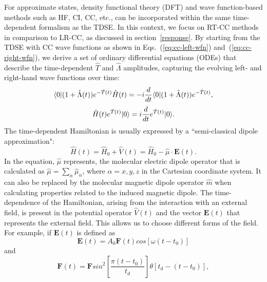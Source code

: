For approximate states, density functional theory (DFT) and wave function-based methods such as HF,\cite{Beck2000, Li2005, Kvaal2011} CI,\cite{Klamroth2003, Krause2005, Krause2007} CC,\cite{Kvaal2012, Nascimento2016, Nascimento2017, Pedersen2019, Kristiansen2020, Ofstad2023, Hauge2023, Park2019, Park2021} etc., can be incorporated within the same time-dependent formalism as the TDSE. In this context, we focus on RT-CC methods in comparison to LR-CC, as discussed in section~\ref{response}. By starting from the TDSE with CC wave functions as shown in Eqs.~(\ref{eq:cc-left-wfn}) and~(\ref{eq:cc-right-wfn}), we derive a set of ordinary differential equations (ODEs) that describe the time-dependent $\hat{T}$ and $\hat{\Lambda}$ amplitudes, capturing the evolving left- and right-hand wave functions over time:
\begin{equation}
\langle0 |(1 + \hat{\Lambda}(t))e^{-\hat{T}(t)}\hat{H}(t) = -i\frac{d}{dt}\langle0 |(1 + \hat{\Lambda}(t))e^{-\hat{T}(t)},
\label{eq:rt-left-wfn}
\end{equation}
\begin{equation}
\hat{H}(t)e^{\hat{T}(t)}| 0 \rangle=i\frac{d}{dt}e^{\hat{T}(t)}| 0 \rangle.
\label{eq:rt-right-wfn}
\end{equation}
The time-dependent Hamiltonian is usually expressed by a ``semi-classical dipole approximation":
\begin{equation}
\hat{H}(t) = \hat{H}_{0} + \hat{V}(t) = \hat{H}_{0} - \hat{\mu} \cdot \textbf{E}(t).
\end{equation}
In the equation, $\hat{\mu}$ represents, the molecular electric dipole operator that is calculated as $\hat{\mu}=\sum_{\alpha}\hat{\mu}_{\alpha}$, where $\alpha=x, y, z$ in the Cartesian coordinate system. It can also be replaced by the molecular magnetic dipole operator $\hat{m}$ when calculating properties related to the induced magnetic dipole. The time-dependence of the Hamiltonian, arising from the interaction with an external field, is present in the potential operator $\hat{V}(t)$ and the vector $\textbf{E}(t)$ that represents the external field. This allows us to choose different forms of the field. For example, if $\textbf{E}(t)$ is defined as
\begin{equation}
\textbf{E}(t) = A_{0}\textbf{F}(t)cos[\omega(t-t_{0})]
\end{equation}
and
\begin{equation}
\textbf{F}(t) = \textbf{F}sin^{2}[\frac{\pi(t-t_{0})}{t_{d}}]\theta[t_{d} - (t - t_{0})], 
\end{equation}
